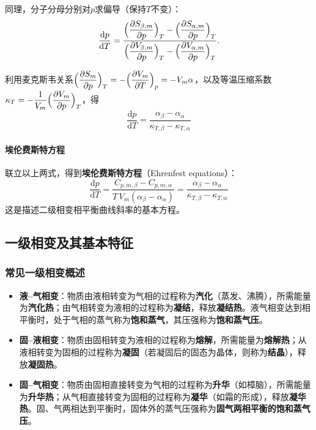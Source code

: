 \documentclass[UTF8]{ctexart}
\theoremstyle{definition}
\begin{document}
同理，分子分母分别对$p$求偏导（保持$T$不变）：
\begin{equation}
\frac{\mathrm{d}p}{\mathrm{d}T}
= \frac{\displaystyle\Bigl(\frac{\partial S_{\beta,m}}{\partial p}\Bigr)_T-\Bigl(\frac{\partial S_{\alpha,m}}{\partial p}\Bigr)_T}
{\displaystyle\Bigl(\frac{\partial V_{\beta,m}}{\partial p}\Bigr)_T-\Bigl(\frac{\partial V_{\alpha,m}}{\partial p}\Bigr)_T}.
\end{equation}

利用麦克斯韦关系$\displaystyle\Bigl(\frac{\partial S_m}{\partial p}\Bigr)_T=-\Bigl(\frac{\partial V_m}{\partial T}\Bigr)_p=-V_m\alpha$，以及等温压缩系数$\displaystyle\kappa_T=-\frac{1}{V_m}\Bigl(\frac{\partial V_m}{\partial p}\Bigr)_T$，得
\begin{equation}
\boxed{\frac{\mathrm{d}p}{\mathrm{d}T}
= \frac{\alpha_\beta-\alpha_\alpha}{\kappa_{T,\beta}-\kappa_{T,\alpha}}}
\end{equation}

\paragraph{埃伦费斯特方程}

联立以上两式，得到\textbf{埃伦费斯特方程}（Ehrenfest equations）：
\begin{equation}
\boxed{\frac{\mathrm{d}p}{\mathrm{d}T}
= \frac{C_{p,m,\beta}-C_{p,m,\alpha}}{T\,V_m(\alpha_\beta-\alpha_\alpha)}
= \frac{\alpha_\beta-\alpha_\alpha}{\kappa_{T,\beta}-\kappa_{T,\alpha}}}
\end{equation}
这是描述二级相变相平衡曲线斜率的基本方程。


\subsection{一级相变及其基本特征}

\subsubsection*{常见一级相变概述}

\begin{itemize}
\item \textbf{液--气相变}：物质由液相转变为气相的过程称为\textbf{汽化}（蒸发、沸腾），所需能量为\textbf{汽化热}；由气相转变为液相的过程称为\textbf{凝结}，释放\textbf{凝结热}。液气相变达到相平衡时，处于气相的蒸气称为\textbf{饱和蒸气}，其压强称为\textbf{饱和蒸气压}。

\item \textbf{固--液相变}：物质由固相转变为液相的过程称为\textbf{熔解}，所需能量为\textbf{熔解热}；从液相转变为固相的过程称为\textbf{凝固}（若凝固后的固态为晶体，则称为\textbf{结晶}），释放\textbf{凝固热}。

\item \textbf{固--气相变}：物质由固相直接转变为气相的过程称为\textbf{升华}（如樟脑），所需能量为\textbf{升华热}；从气相直接转变为固相的过程称为\textbf{凝华}（如霜的形成），释放\textbf{凝华热}。固、气两相达到平衡时，固体外的蒸气压强称为\textbf{固气两相平衡的饱和蒸气压}。
\end{itemize}
\end{document}
